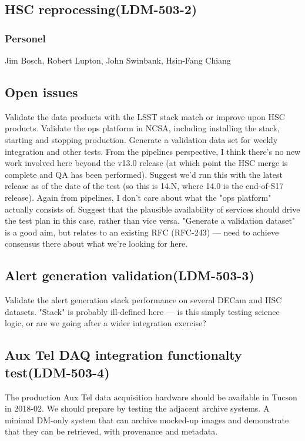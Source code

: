 \subsection{ HSC reprocessing\textbf{(LDM-503-2)}\label{LDM-503-2}}
\subsubsection{Personel}
Jim Bosch, Robert Lupton, John Swinbank, Hsin-Fang Chiang

\subsection{Open issues}
 Validate the data products with the LSST stack match or improve upon HSC products.
 Validate the ops platform in NCSA, including installing the stack, starting and stopping production.
 Generate a validation data set for weekly integration and other tests.
 \newline From the pipelines perspective, I think there's no new work involved here beyond the v13.0 release (at which point the HSC merge is complete and QA has been performed). Suggest we'd run this with the latest release as of the date of the test (so this is 14.N, where 14.0 is the end-of-S17 release).
 Again from pipelines, I don't care about what the "ops platform" actually consists of. Suggest that the plausible availability of services should drive the test plan in this case, rather than vice versa.
 "Generate a validation dataset" is a good aim, but relates to an existing RFC (RFC-243) — need to achieve consensus there about what we're looking for here.



\subsection{ Alert generation validation\textbf{(LDM-503-3)}\label{LDM-503-3}}
 Validate the alert generation stack performance on several DECam and HSC datasets.
 \newline "Stack" is probably ill-defined here — is this simply testing science logic, or are we going after a wider integration exercise?
\subsection{ Aux Tel DAQ integration functionalty test\textbf{(LDM-503-4)}\label{LDM-503-4}}
 The production Aux Tel data acquisition hardware should be available in Tucson in 2018-02. We should prepare by testing the adjacent archive systems.
 \newline A minimal DM-only system that can archive mocked-up images and demonstrate that they can be retrieved, with provenance and metadata.
